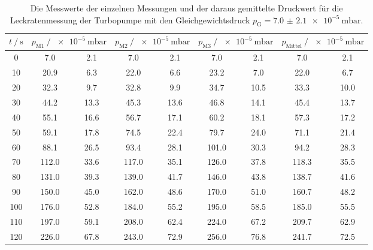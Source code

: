   \begin{table}[h]
    \centering
    \caption{Die Messwerte der einzelnen Messungen und der daraus gemittelte Druckwert für die Leckratenmessung der Turbopumpe mit den 
    Gleichgewichtsdruck $p_\text{G} = \SI{7.0(21)e-5}{\milli\bar}$.}
    \label{tab:turbo_leck_7}
    \begin{tabular}{S[table-format=3.0] S @{${}\pm{}$} S[table-format=2.2] S @{${}\pm{}$} S[table-format=2.2] S @{${}\pm{}$} S[table-format=2.2] S @{${}\pm{}$} S[table-format=2.2]}
    \toprule
    {$t \mathbin{/} \si{\second} $} &  &  &  &  \\
     &   7.0 &  2.1 &   7.0 &  2.1 &   7.0 &   2.1 &   7.0  &  2.1 \\
     10 &  20.9 &  6.3 &  22.0 &  6.6 &  23.2 &   7.0 &  22.0  &  6.7 \\
     20 &  32.3 &  9.7 &  32.8 &  9.9 &  34.7 &  10.5 &  33.3  & 10.0 \\
     30 &  44.2 & 13.3 &  45.3 & 13.6 &  46.8 &  14.1 &  45.4  & 13.7 \\
     40 &  55.1 & 16.6 &  56.7 & 17.1 &  60.2 &  18.1 &  57.3  & 17.2 \\
     50 &  59.1 & 17.8 &  74.5 & 22.4 &  79.7 &  24.0 &  71.1  & 21.4 \\
     60 &  88.1 & 26.5 &  93.4 & 28.1 & 101.0 &  30.3 &  94.2  & 28.3 \\
     70 & 112.0 & 33.6 & 117.0 & 35.1 & 126.0 &  37.8 & 118.3  & 35.5 \\
     80 & 131.0 & 39.3 & 139.0 & 41.7 & 146.0 &  43.8 & 138.7  & 41.6 \\
     90 & 150.0 & 45.0 & 162.0 & 48.6 & 170.0 &  51.0 & 160.7  & 48.2 \\
    100 & 176.0 & 52.8 & 184.0 & 55.2 & 195.0 &  58.5 & 185.0  & 55.5 \\
    110 & 197.0 & 59.1 & 208.0 & 62.4 & 224.0 &  67.2 & 209.7  & 62.9 \\
    120 & 226.0 & 67.8 & 243.0 & 72.9 & 256.0 &  76.8 & 241.7  & 72.5 \\
    \bottomrule
    \end{tabular}
  \end{table}

